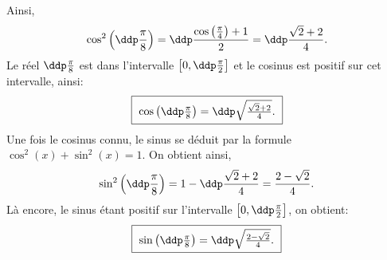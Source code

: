 \begin{correction}
\begin{itemize}
Ainsi, 
$$\cos^2{\left(\ddp\frac{\pi}{8}\right)}=\ddp\frac{\cos{\left(\frac{\pi}{4}\right)}+1}{2}=\ddp\frac{\sqrt{2}+2}{4}.$$
Le r\'eel $\ddp\frac{\pi}{8}$ est dans l'intervalle $\left\lbrack 0,\ddp\frac{\pi}{2}\right\rbrack$ et le cosinus est positif sur cet intervalle, ainsi: 
\begin{equation*}
\fbox{
$\cos{\left(\ddp\frac{\pi}{8}\right)}=\ddp\sqrt{\frac{\sqrt{2}+2}{4}}.$
}
\end{equation*}
Une fois le cosinus connu, le sinus se d\'eduit par la formule $\cos^2{(x)}+\sin^2{(x)}=1$. On obtient ainsi, 
$$\sin^2{\left(\ddp\frac{\pi}{8}\right)}=1-\ddp \frac{\sqrt{2}+2}{4} = \frac{2-\sqrt{2}}{4}.$$
L\`a encore, le sinus \'etant positif sur l'intervalle $\left\lbrack 0,\ddp\frac{\pi}{2}\right\rbrack$, on obtient: 
\begin{equation*}
\fbox{
$\sin{\left(\ddp\frac{\pi}{8}\right)}=\ddp\sqrt{\frac{2-\sqrt{2}}{4}}.$
}
\end{equation*}
\end{itemize}
\end{correction}